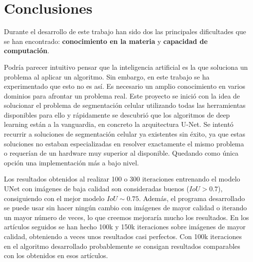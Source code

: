 \chapter{Conclusiones}\label{pruebas}

Durante el desarrollo de este trabajo han sido dos las principales dificultades que se han encontrado: \textbf{conocimiento en la materia} y \textbf{capacidad de computación}.

Podría parecer intuitivo pensar que la inteligencia artificial es la que soluciona un problema al aplicar un algoritmo. Sin embargo, en este trabajo se ha experimentado que esto no es así. Es necesario un amplio conocimiento en varios dominios para afrontar un problema real. Este proyecto se inició con la idea de solucionar el problema de segmentación celular utilizando todas las herramientas disponibles para ello y rápidamente se descubrió que los algoritmos de deep learning están a la vanguardia, en concreto la arquitectura U-Net. Se intentó recurrir a soluciones de segmentación celular ya existentes sin éxito, ya que estas soluciones no estaban especializadas en resolver exactamente el mismo problema o requerían de un hardware muy superior al disponible. Quedando como única opción una implementación más a bajo nivel.

Los resultados obtenidos al realizar 100 o 300 iteraciones entrenando el modelo UNet con imágenes de baja calidad son consideradas buenos ($IoU>0.7$), consiguiendo con el mejor modelo $IoU\sim0.75$. Además, el programa desarrollado se puede usar sin hacer ningún cambio con imágenes de mayor calidad o iterando un mayor número de veces, lo que creemos mejoraría mucho los resultados. En los artículos seguidos se han hecho 100k y 150k iteraciones sobre imágenes de mayor calidad, obteniendo a veces unos resultados casi perfectos. Con 100k iteraciones en el algoritmo desarrollado probablemente se consigan resultados comparables con los obtenidos en esos artículos.
